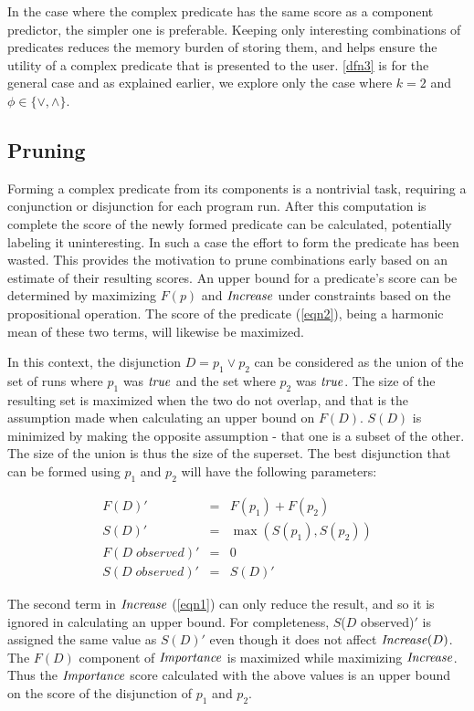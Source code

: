 In the case where the complex predicate has the same score as a component predictor, the simpler one is preferable.  Keeping only interesting combinations of predicates reduces the memory burden of storing them, and helps ensure the utility of a complex predicate that is presented to the user.  \autoref{dfn3} is for the general case and as explained earlier, we explore only the case where $k = 2$ and $\phi \in \{\vee, \wedge\}$.

\subsection{Pruning}
\label{sec-pruning}
Forming a complex predicate from its components is a nontrivial task, requiring a conjunction or disjunction for each program run.  After this computation is complete the score of the newly formed predicate can be calculated, potentially labeling it uninteresting.  In such a case the effort to form the predicate has been wasted.  This provides the motivation to prune combinations early based on an estimate of their resulting scores.  An upper bound for a predicate's score can be determined by maximizing $F(p)$ and $\mathit{Increase}$ under constraints based on the propositional operation.  The score of the predicate (\autoref{eqn2}), being a harmonic mean of these two terms, will likewise be maximized.

In this context, the disjunction $D = p_1 \vee p_2$ can be considered as the union of the set of runs where $p_1$ was $\mathit{true}$ and the set where $p_2$ was $\mathit{true}$.  The size of the resulting set is maximized when the two do not overlap, and that is the assumption made when calculating an upper bound on $F(D)$.  $S(D)$ is minimized by making the opposite assumption - that one is a subset of the other.  The size of the union is thus the size of the superset.  The best disjunction that can be formed using $p_1$ and $p_2$ will have the following parameters:

\begin{eqnarray*}
  F(D)' &=&  F(p_1) + F(p_2) \\
  S(D)' &=&  \max(S(p_1),S(p_2)) \\
  F(D\;observed)' &=& 0 \\
  S(D\;observed)' &=& S(D)'
\end{eqnarray*}

The second term in $\mathit{Increase}$ (\autoref{eqn1}) can only reduce the result, and so it is ignored in calculating an upper bound.  For completeness, $S$($D$ observed)$'$ is assigned the same value as $S(D)'$ even though it does not affect $\mathit{Increase}(D)$.  The $F(D)$ component of $\mathit{Importance}$ is maximized while maximizing $\mathit{Increase}$.  Thus the $\mathit{Importance}$ score calculated with the above values is an upper bound on the score of the disjunction of $p_1$ and $p_2$.

